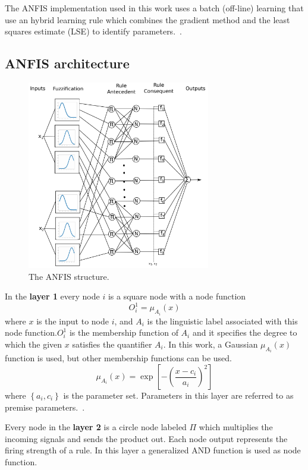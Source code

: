 \documentclass[10pt,twocolumn,letterpaper]{article}
\begin{document}
The ANFIS implementation used in this work uses a batch (off-line) learning that use an hybrid learning rule which combines the gradient method and the least squares estimate (LSE) to identify parameters.~\cite{jang}.

\subsection{ANFIS architecture}

\begin{figure}[h]
\includegraphics[width=8cm]{images/anfis-layers.PNG}
\caption{The ANFIS structure.}
\end{figure}
In the \textbf{layer 1} every node $i$ is a square node with a node function
\begin{equation}
O_{i}^{1}=\mu_{A_{i}}(x)
\end{equation}
where $x$ is the input to node $i$, and $A_{i}$ is the linguistic label associated with this node function.$O_{i}^{1}$ is the membership function of $A_{i}$ and it specifies the degree to which the given $x$ satisfies the quantifier $A_{i} .$ In this work, a Gaussian $\mu_{A_{i}}(x)$ function is used, but other membership functions can be used.
$$
\mu_{A_{i}}(x)=\exp \left[-\left(\frac{x-c_{i}}{a_{i}}\right)^{2}\right]
$$
where $\left\{a_{i}, c_{i}\right\}$ is the parameter set. Parameters in this layer are referred to as premise parameters.~\cite{jang}.

Every node in the \textbf{layer 2} is a circle node labeled $\Pi$ which multiplies the incoming signals and sends the
product out. Each node output represents the firing strength of a rule. In this layer a generalized AND function is used as node function.
\end{document}
